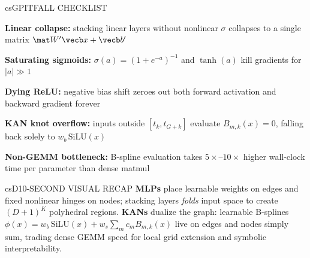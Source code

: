 \documentclass[../../../../master.tex]{subfiles}
\begin{document}
\begin{cscolumns}
\begin{cscard}{csG}{PITFALL CHECKLIST}
  \begin{csbul}
    \item \textbf{Linear collapse:} stacking linear layers without nonlinear $\sigma$ collapses to a single matrix $\mat W'\vecb x+\vecb b'$
    \item \textbf{Saturating sigmoids:} $\sigma(a)=(1+e^{-a})^{-1}$ and $\tanh(a)$ kill gradients for $|a|\gg 1$
    \item \textbf{Dying ReLU:} negative bias shift zeroes out both forward activation and backward gradient forever
    \item \textbf{KAN knot overflow:} inputs outside $[t_k,t_{G+k}]$ evaluate $B_{m,k}(x)=0$, falling back solely to $w_b\,\mathrm{SiLU}(x)$
    \item \textbf{Non-GEMM bottleneck:} B-spline evaluation takes $5\times$--$10\times$ higher wall-clock time per parameter than dense matmul
  \end{csbul}
\end{cscard}

\begin{cscard}{csD}{10-SECOND VISUAL RECAP}
  \sffamily\footnotesize
  \textbf{MLPs} place learnable weights on edges and fixed nonlinear hinges on nodes; stacking layers \emph{folds} input space to create $(D{+}1)^K$ polyhedral regions.
  \textbf{KANs} dualize the graph: learnable B-splines $\phi(x)=w_b\,\mathrm{SiLU}(x)+w_s\sum_m c_m B_{m,k}(x)$ live on edges and nodes simply sum, trading dense GEMM speed for local grid extension and symbolic interpretability.
\end{cscard}
\end{cscolumns}

\csend
\end{document}
